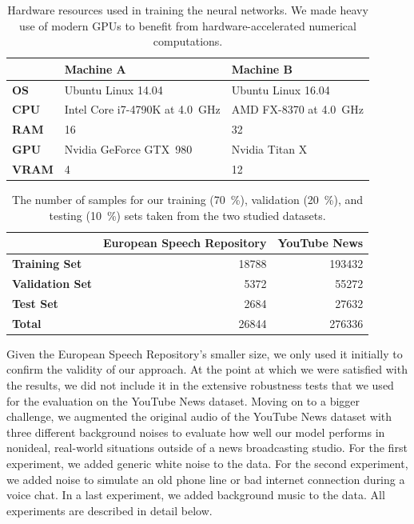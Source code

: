 	\begin{table}[tp]
	\centering
	\begin{tabu}{lll}
	\toprule
	  		& \textbf{Machine A} 					& \textbf{Machine B} \\ \midrule
	\textbf{OS}  	& Ubuntu Linux 14.04 		& Ubuntu Linux 16.04 \\
	\textbf{CPU}  	& Intel Core i7-4790K at \SI{4.0}{\giga\hertz} & AMD FX-8370 at \SI{4.0}{\giga\hertz} \\
	\textbf{RAM}  	& \SI{16}{\giga\byte} 						& \SI{32}{\giga\byte} \\
	\textbf{GPU}  	& Nvidia GeForce GTX~980 	& Nvidia Titan X \\
	\textbf{VRAM}  	& \SI{4}{\giga\byte} 						& \SI{12}{\giga\byte} \\
	\bottomrule
	\end{tabu}
	\caption{Hardware resources used in training the neural networks. We made heavy use of modern GPUs to benefit from hardware-accelerated numerical computations.}
	\label{tab:hardware}
	\end{table}
	\begin{table}[tp]
	\centering
	\begin{tabu}{lrr}
	\toprule
	  				& \textbf{European Speech Repository} & \textbf{YouTube News}\\ \midrule
	\textbf{Training Set}    & \num{18788}						 & \num{193432} \\
	\textbf{Validation Set}  & \num{5372}						 & \num{55272} \\
	\textbf{Test Set}        & \num{2684}						 & \num{27632} \\
	\midrule
	\textbf{Total}           & \num{26844}						 & \num{276336} \\
	\bottomrule
	\end{tabu}
	\caption{The number of samples for our training (\SI{70}{\percent}), validation (\SI{20}{\percent}), and testing (\SI{10}{\percent}) sets taken from the two studied datasets.}
	\label{tab:data_splits}
	\end{table}

	Given the European Speech Repository's smaller size, we only used it initially to confirm the validity of our approach. At the point at which we were satisfied with the results, we did not include it in the extensive robustness tests that we used for the evaluation on the YouTube News dataset. Moving on to a bigger challenge, we augmented the original audio of the YouTube News dataset with three different background noises to evaluate how well our model performs in nonideal, real-world situations outside of a news broadcasting studio. For the first experiment, we added generic white noise to the data. For the second experiment, we added noise to simulate an old phone line or bad internet connection during a voice chat. In a last experiment, we added background music to the data. All experiments are described in detail below.


